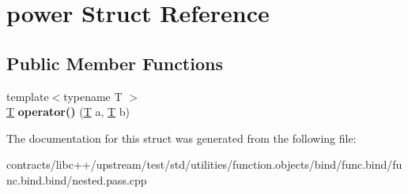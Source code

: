 \hypertarget{structpower}{}\section{power Struct Reference}
\label{structpower}
\subsection*{Public Member Functions}
\begin{DoxyCompactItemize}
\item 
\mbox{\label{structpower_a3ce8bb2e6d4060d4852259f4bcc9872b}} 
{\footnotesize template$<$typename T $>$ }\\\mbox{\hyperlink{struct_t}{T}} {\bfseries operator()} (\mbox{\hyperlink{struct_t}{T}} a, \mbox{\hyperlink{struct_t}{T}} b)
\end{DoxyCompactItemize}


The documentation for this struct was generated from the following file\+:\begin{DoxyCompactItemize}
\item 
contracts/libc++/upstream/test/std/utilities/function.\+objects/bind/func.\+bind/func.\+bind.\+bind/nested.\+pass.\+cpp\end{DoxyCompactItemize}
